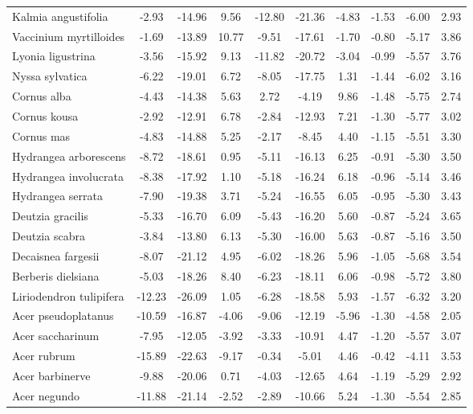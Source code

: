\documentclass[11pt]{article}
\begin{document}
\begin{longtable}{p{1.50in}c{0.32in}c{0.32in}c{0.32in}c{0.32in}c{0.32in}c{0.32in}c{0.2in}c{0.3in}c{0.1in}}
  Kalmia angustifolia & -2.93 & -14.96 & 9.56 & -12.80 & -21.36 & -4.83 & -1.53 & -6.00 & 2.93 \\ 
  Vaccinium myrtilloides & -1.69 & -13.89 & 10.77 & -9.51 & -17.61 & -1.70 & -0.80 & -5.17 & 3.86 \\ 
  Lyonia ligustrina & -3.56 & -15.92 & 9.13 & -11.82 & -20.72 & -3.04 & -0.99 & -5.57 & 3.76 \\ 
  Nyssa sylvatica & -6.22 & -19.01 & 6.72 & -8.05 & -17.75 & 1.31 & -1.44 & -6.02 & 3.16 \\ 
  Cornus alba & -4.43 & -14.38 & 5.63 & 2.72 & -4.19 & 9.86 & -1.48 & -5.75 & 2.74 \\ 
  Cornus kousa & -2.92 & -12.91 & 6.78 & -2.84 & -12.93 & 7.21 & -1.30 & -5.77 & 3.02 \\ 
  Cornus mas & -4.83 & -14.88 & 5.25 & -2.17 & -8.45 & 4.40 & -1.15 & -5.51 & 3.30 \\ 
  Hydrangea arborescens & -8.72 & -18.61 & 0.95 & -5.11 & -16.13 & 6.25 & -0.91 & -5.30 & 3.50 \\ 
  Hydrangea involucrata & -8.38 & -17.92 & 1.10 & -5.18 & -16.24 & 6.18 & -0.96 & -5.14 & 3.46 \\ 
  Hydrangea serrata & -7.90 & -19.38 & 3.71 & -5.24 & -16.55 & 6.05 & -0.95 & -5.30 & 3.43 \\ 
  Deutzia gracilis & -5.33 & -16.70 & 6.09 & -5.43 & -16.20 & 5.60 & -0.87 & -5.24 & 3.65 \\ 
  Deutzia scabra & -3.84 & -13.80 & 6.13 & -5.30 & -16.00 & 5.63 & -0.87 & -5.16 & 3.50 \\ 
  Decaisnea fargesii & -8.07 & -21.12 & 4.95 & -6.02 & -18.26 & 5.96 & -1.05 & -5.68 & 3.54 \\ 
  Berberis dielsiana & -5.03 & -18.26 & 8.40 & -6.23 & -18.11 & 6.06 & -0.98 & -5.72 & 3.80 \\ 
  Liriodendron tulipifera & -12.23 & -26.09 & 1.05 & -6.28 & -18.58 & 5.93 & -1.57 & -6.32 & 3.20 \\ 
  Acer pseudoplatanus & -10.59 & -16.87 & -4.06 & -9.06 & -12.19 & -5.96 & -1.30 & -4.58 & 2.05 \\ 
  Acer saccharinum & -7.95 & -12.05 & -3.92 & -3.33 & -10.91 & 4.47 & -1.20 & -5.57 & 3.07 \\ 
  Acer rubrum & -15.89 & -22.63 & -9.17 & -0.34 & -5.01 & 4.46 & -0.42 & -4.11 & 3.53 \\ 
  Acer barbinerve & -9.88 & -20.06 & 0.71 & -4.03 & -12.65 & 4.64 & -1.19 & -5.29 & 2.92 \\ 
  Acer negundo & -11.88 & -21.14 & -2.52 & -2.89 & -10.66 & 5.24 & -1.30 & -5.54 & 2.85 \\ 

\end{longtable}
\end{document}
